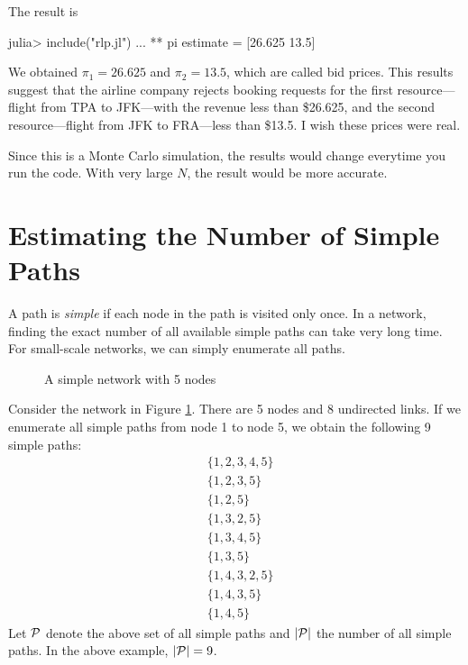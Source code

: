 The result is
\begin{code}
julia> include("rlp.jl")
...
** pi estimate = [26.625 13.5]
\end{code}
\noindent We obtained $\pi_1 = 26.625$ and $\pi_2=13.5$, which are called bid prices. This results suggest that the airline company rejects booking requests for the first resource---flight from TPA to JFK---with the revenue less than \$26.625, and the second resource---flight from JFK to FRA---less than \$13.5. I wish these prices were real.

Since this is a Monte Carlo simulation, the results would change everytime you run the code. With very large $N$, the result would be more accurate.



\section{Estimating the Number of Simple Paths} \label{sec:pathdistribution}

 A path is \emph{simple} if each node in the path is visited only once. In a network, finding the exact number of all available simple paths can take very long time. For small-scale networks, we can simply enumerate all paths.

\begin{figure}
\caption{A simple network with 5 nodes \label{fig:simple_monte}}
\end{figure}

Consider the network in Figure \ref{fig:simple_monte}. There are 5 nodes and 8 undirected links. If we enumerate all simple paths from node 1 to node 5, we obtain the following 9 simple paths:
\begin{align*}
& \{1,2,3,4,5\} \\
& \{1,2,3,5\} \\
& \{1,2,5\} \\
& \{1,3,2,5\} \\
& \{1,3,4,5\} \\
& \{1,3,5\} \\
& \{1,4,3,2,5\} \\
& \{1,4,3,5\} \\
& \{1,4,5\}
\end{align*}
Let $\mathcal{P}$ denote the above set of all simple paths and $|\mathcal{P}|$ the number of all simple paths. In the above example, $|\mathcal{P}|=9$.

